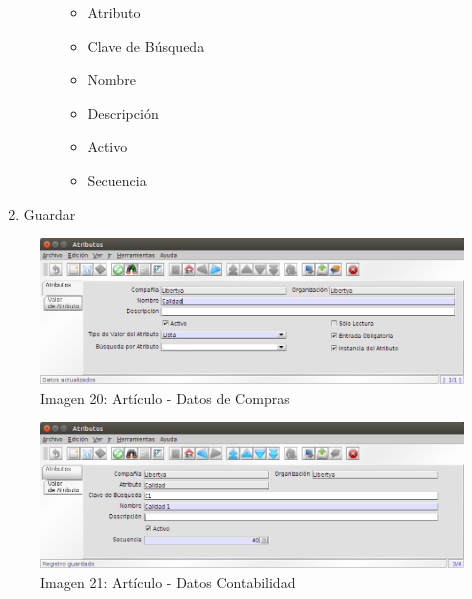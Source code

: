 \documentclass[letterpaper,10pt,spanish]{sphinxmanual}
\begin{document}
\begin{enumerate}
\begin{description}
\begin{itemize}
\item {} 
Atributo

\item {} 
Clave de Búsqueda

\item {} 
Nombre

\item {} 
Descripción

\item {} 
Activo

\item {} 
Secuencia

\end{itemize}

\end{description}

\item {} 
Guardar

\end{enumerate}
\begin{figure}[htbp]
\centering
\capstart

\includegraphics{ly_attr1.png}
\caption{Imagen 20: Artículo - Datos de Compras}\end{figure}
\begin{figure}[htbp]
\centering
\capstart

\includegraphics{ly_attr2.png}
\caption{Imagen 21: Artículo - Datos Contabilidad}\end{figure}
\end{document}
